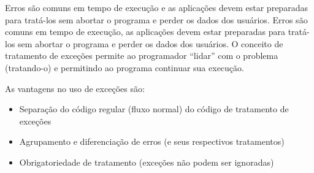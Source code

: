 Erros são comuns em tempo de execução e as aplicações devem estar preparadas para tratá-los 
sem abortar o programa e perder os dados dos usuários. Erros são comuns em tempo de execução, 
as aplicações devem estar preparadas para tratá-los sem abortar o programa e perder os dados 
dos usuários. O conceito de tratamento de exceções permite ao programador ``lidar'' com o 
problema (tratando-o) e permitindo ao programa continuar sua execução.

As vantagens no uso de exceções são: 

\begin{itemize}
\item Separação do código regular (fluxo normal) do código de tratamento de exceções
\item Agrupamento e diferenciação de erros (e seus respectivos tratamentos)
\item Obrigatoriedade de tratamento (exceções não podem ser ignoradas)
\end{itemize}



